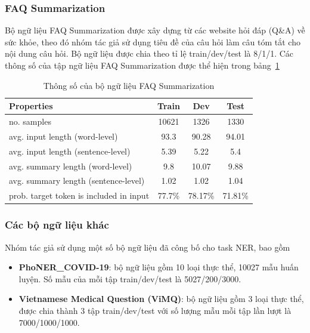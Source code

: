 \subsubsection{FAQ Summarization}
Bộ ngữ liệu FAQ Summarization được xây dựng từ các website hỏi đáp (Q\&A) về sức khỏe, theo đó nhóm tác giả sử dụng tiêu đề của câu hỏi làm câu tóm tắt cho nội dung câu hỏi. Bộ ngữ liệu được chia theo tỉ lệ train/dev/test là 8/1/1. Các thông số của tập ngữ liệu FAQ Summarization được thể hiện trong bảng~\ref{tab:faq-summarization-stats}

\begin{table}
\centering
\begin{tabular}{|p{3.75cm}|c|c|c|}
\hline
\textbf{Properties} & \textbf{Train} & \textbf{Dev} & \textbf{Test} \\ \hline
no. samples & 10621 & 1326 & 1330 \\ \hline
avg. input length (word-level) & 93.3 & 90.28 & 94.01 \\ \hline
avg. input length (sentence-level) & 5.39 & 5.22 & 5.4 \\ \hline
avg. summary length (word-level) & 9.8 & 10.07 & 9.88 \\ \hline
avg. summary length (sentence-level) & 1.02 & 1.02 & 1.04 \\ \hline
prob. target token is included in input & 77.7\% & 78.17\% & 71.81\% \\ \hline
\end{tabular}
\caption{Thông số của bộ ngữ liệu FAQ Summarization\cite{minh-EtAl:2022:LREC}}
\label{tab:faq-summarization-stats}
\end{table}

\subsubsection{Các bộ ngữ liệu khác}
Nhóm tác giả sử dụng một số bộ ngữ liệu đã công bố cho task NER, bao gồm
\begin{itemize}
\item \textbf{PhoNER\_COVID-19\cite{truong-etal-2021-covid}}: bộ ngữ liệu gồm 10 loại thực thể, 10027 mẫu huấn luyện. Số mẫu của mỗi tập train/dev/test là 5027/200/3000.
\item \textbf{Vietnamese Medical Question (ViMQ)\cite{vimq-2021}}: bộ ngữ liệu gồm 3 loại thực thể, được chia thành 3 tập train/dev/test với số lượng mẫu mỗi tập lần lượt là 7000/1000/1000.
\end{itemize}